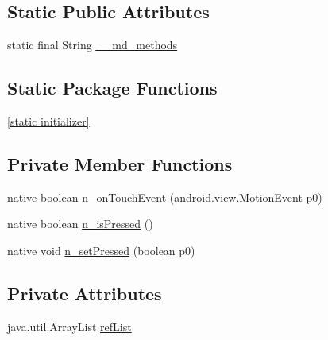 \subsection*{Static Public Attributes}
\begin{CompactItemize}
\item 
static final String \hyperlink{classmd5b60ffeb829f638581ab2bb9b1a7f4f3f_1_1_forms_seek_bar_7c8d57a3b8d9e0664dc0d6410af2b631}{\_\-\_\-md\_\-methods}
\end{CompactItemize}
\subsection*{Static Package Functions}
\begin{CompactItemize}
\item 
\hyperlink{classmd5b60ffeb829f638581ab2bb9b1a7f4f3f_1_1_forms_seek_bar_b987ffc3fa8efe58477490cc2020ac77}{\mbox{[}static initializer\mbox{]}}
\end{CompactItemize}
\subsection*{Private Member Functions}
\begin{CompactItemize}
\item 
native boolean \hyperlink{classmd5b60ffeb829f638581ab2bb9b1a7f4f3f_1_1_forms_seek_bar_a4dc7163026ee545dc2829db5cacddcb}{n\_\-onTouchEvent} (android.view.MotionEvent p0)
\item 
native boolean \hyperlink{classmd5b60ffeb829f638581ab2bb9b1a7f4f3f_1_1_forms_seek_bar_d159f91f4c3d0cea0cd6d22b1ca45870}{n\_\-isPressed} ()
\item 
native void \hyperlink{classmd5b60ffeb829f638581ab2bb9b1a7f4f3f_1_1_forms_seek_bar_43c91a743f795b460a3a27e8690d828a}{n\_\-setPressed} (boolean p0)
\end{CompactItemize}
\subsection*{Private Attributes}
\begin{CompactItemize}
\item 
java.util.ArrayList \hyperlink{classmd5b60ffeb829f638581ab2bb9b1a7f4f3f_1_1_forms_seek_bar_6ddd1f5719fb4c93d3a92c0d6b9a6694}{refList}
\end{CompactItemize}


